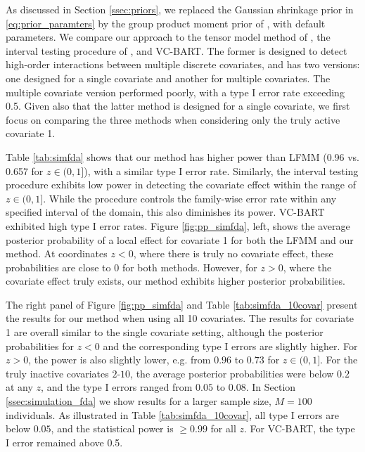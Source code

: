 As discussed in Section \ref{ssec:priors}, we replaced the Gaussian shrinkage prior in \eqref{eq:prior_paramters} by the group product moment prior of \citet{rossell:2021}, with default parameters.
We compare our approach to the tensor model method of \cite{paulon:2023}, the interval testing procedure of \cite{pini:2016},  and VC-BART.
The former is designed to detect high-order interactions between multiple discrete covariates, and has two versions: one designed for a single covariate and another for multiple covariates. The multiple covariate version performed poorly, with a type I error rate exceeding 0.5. 
Given also that the latter method is designed for a single covariate, we first focus on comparing the three methods when considering only the truly active covariate 1.

Table \ref{tab:simfda} shows that our method has higher power than LFMM (0.96 vs. 0.657 for $z \in (0,1]$), with a similar type I error rate.  Similarly, the interval testing procedure exhibits low power in detecting the covariate effect within the range of $z \in (0,1]$. While the procedure controls the family-wise error rate within any specified interval of the domain, this also diminishes its power.  VC-BART exhibited high type I error rates. 
Figure \ref{fig:pp_simfda}, left, shows the average posterior probability of a local effect for covariate 1 for both the LFMM and our method. At coordinates $z<0$, where there is truly no covariate effect, these probabilities are close to 0 for both methods. However, for $z>0$, where the covariate effect truly exists, our method exhibits higher posterior probabilities. 


The right panel of Figure \ref{fig:pp_simfda} and Table \ref{tab:simfda_10covar} present the results for our method when using all 10 covariates. The results for covariate 1 are overall similar to the single covariate setting, although the posterior probabilities for $z<0$ and the corresponding type I errors are slightly higher. For  $z>0$, the power is also slightly lower, e.g. from $0.96$ to $0.73$ for $z \in (0,1]$. For the truly inactive covariates $2$-$10$, the average posterior probabilities were below $0.2$ at any $z$, and the type I errors ranged from $0.05$ to $0.08$. In Section \ref{ssec:simulation_fda} we show results for a larger sample size, $M=100$ individuals. As illustrated in Table \ref{tab:simfda_10covar},  all type I errors are below $0.05$, and the statistical power is $\geq 0.99$ for all $z$. %
 For VC-BART, the type I error remained above 0.5.  

